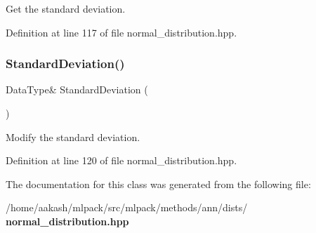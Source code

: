 Get the standard deviation. 



Definition at line 117 of file normal\+\_\+distribution.\+hpp.

\mbox{\label{classmlpack_1_1ann_1_1NormalDistribution_afdbf13414be377e6b3520205f87f5090}} 
\subsubsection{Standard\+Deviation()\hspace{0.1cm}{\footnotesize\ttfamily [2/2]}}
{\footnotesize\ttfamily Data\+Type\& Standard\+Deviation (\begin{DoxyParamCaption}{ }\end{DoxyParamCaption})\hspace{0.3cm}{\ttfamily [inline]}}



Modify the standard deviation. 



Definition at line 120 of file normal\+\_\+distribution.\+hpp.



The documentation for this class was generated from the following file\+:\begin{DoxyCompactItemize}
\item 
/home/aakash/mlpack/src/mlpack/methods/ann/dists/\textbf{ normal\+\_\+distribution.\+hpp}\end{DoxyCompactItemize}
